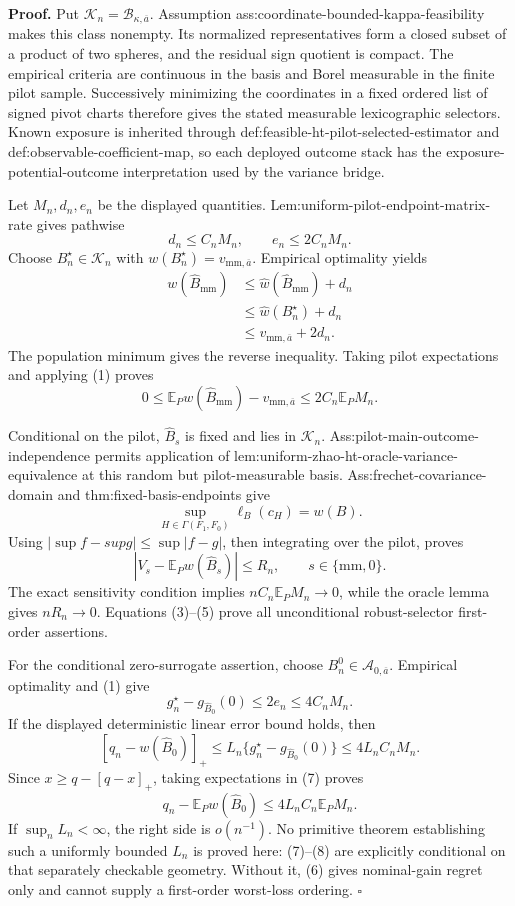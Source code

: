 \textbf{Proof.}
Put \(\mathcal K_n=\mathcal B_{\kappa,\overline a}\).  Assumption ass:coordinate-bounded-kappa-feasibility makes this class nonempty.  Its normalized representatives form a closed subset of a product of two spheres, and the residual sign quotient is compact.  The empirical criteria are continuous in the basis and Borel measurable in the finite pilot sample.  Successively minimizing the coordinates in a fixed ordered list of signed pivot charts therefore gives the stated measurable lexicographic selectors.  Known exposure is inherited through def:feasible-ht-pilot-selected-estimator and def:observable-coefficient-map, so each deployed outcome stack has the exposure-potential-outcome interpretation used by the variance bridge.

Let \(M_n,d_n,e_n\) be the displayed quantities.  Lem:uniform-pilot-endpoint-matrix-rate gives pathwise
\[
d_n\le C_nM_n,
\qquad e_n\le2C_nM_n.
\tag{1}
\]
Choose \(B_n^\star\in\mathcal K_n\) with \(w(B_n^\star)=v_{\mathrm{mm},\overline a}\).  Empirical optimality yields
\[
\begin{aligned}
w(\widehat B_{\mathrm{mm}})
&\le\widehat w(\widehat B_{\mathrm{mm}})+d_n\\
&\le\widehat w(B_n^\star)+d_n\\
&\le v_{\mathrm{mm},\overline a}+2d_n.
\end{aligned}
\tag{2}
\]
The population minimum gives the reverse inequality.  Taking pilot expectations and applying (1) proves
\[
0\le\mathbb E_Pw(\widehat B_{\mathrm{mm}})-v_{\mathrm{mm},\overline a}
\le2C_n\mathbb E_PM_n.
\tag{3}
\]

Conditional on the pilot, \(\widehat B_s\) is fixed and lies in \(\mathcal K_n\).  Ass:pilot-main-outcome-independence permits application of lem:uniform-zhao-ht-oracle-variance-equivalence at this random but pilot-measurable basis.  Ass:frechet-covariance-domain and thm:fixed-basis-endpoints give
\[
\sup_{H\in\Gamma(F_1,F_0)}\ell_B(c_H)=w(B).
\tag{4}
\]
Using \(|\sup f-sup g|\le\sup|f-g|\), then integrating over the pilot, proves
\[
|V_s-\mathbb E_Pw(\widehat B_s)|\le R_n,
\qquad s\in\{\mathrm{mm},0\}.
\tag{5}
\]
The exact sensitivity condition implies \(nC_n\mathbb E_PM_n\to0\), while the oracle lemma gives \(nR_n\to0\).  Equations (3)--(5) prove all unconditional robust-selector first-order assertions.

For the conditional zero-surrogate assertion, choose \(B_n^0\in\mathcal A_{0,\overline a}\).  Empirical optimality and (1) give
\[
g_n^\star-g_{\widehat B_0}(0)\le2e_n\le4C_nM_n.
\tag{6}
\]
If the displayed deterministic linear error bound holds, then
\[
[q_n-w(\widehat B_0)]_+
\le L_n\{g_n^\star-g_{\widehat B_0}(0)\}
\le4L_nC_nM_n.
\tag{7}
\]
Since \(x\ge q-[q-x]_+\), taking expectations in (7) proves
\[
q_n-\mathbb E_Pw(\widehat B_0)
\le4L_nC_n\mathbb E_PM_n.
\tag{8}
\]
If \(\sup_nL_n<\infty\), the right side is \(o(n^{-1})\).  No primitive theorem establishing such a uniformly bounded \(L_n\) is proved here: (7)--(8) are explicitly conditional on that separately checkable geometry.  Without it, (6) gives nominal-gain regret only and cannot supply a first-order worst-loss ordering. \(\square\)